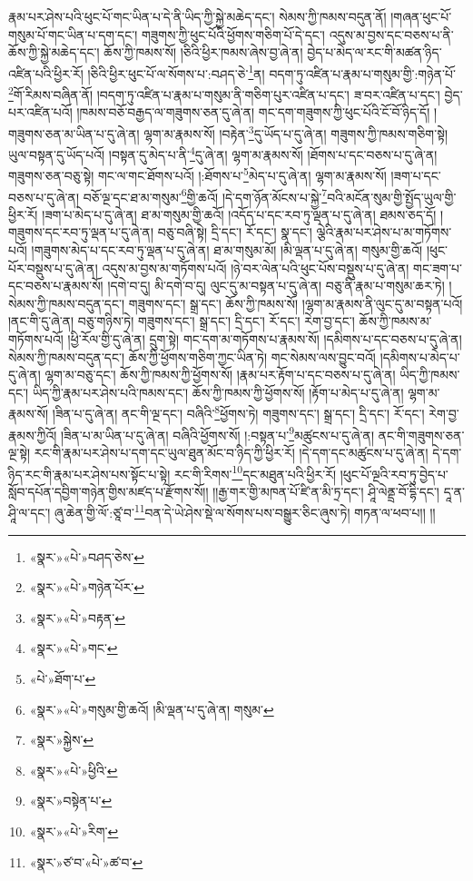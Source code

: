 རྣམ་པར་ཤེས་པའི་ཕུང་པོ་གང་ཡིན་པ་དེ་ནི་ཡིད་ཀྱི་སྐྱེ་མཆེད་དང་། སེམས་ཀྱི་ཁམས་བདུན་ནོ། །གཞན་ཕུང་པོ་གསུམ་པོ་གང་ཡིན་པ་དག་དང་། གཟུགས་ཀྱི་ཕུང་པོའི་ཕྱོགས་གཅིག་པོ་དེ་དང་། འདུས་མ་བྱས་དང་བཅས་པ་ནི་ཆོས་ཀྱི་སྐྱེ་མཆེད་དང་། ཆོས་ཀྱི་ཁམས་སོ། །ཅིའི་ཕྱིར་ཁམས་ཞེས་བྱ་ཞེ་ན། བྱེད་པ་མེད་ལ་རང་གི་མཚན་ཉིད་འཛིན་པའི་ཕྱིར་རོ། །ཅིའི་ཕྱིར་ཕུང་པོ་ལ་སོགས་པ་:བཤད་ཅེ་\footnote{«སྣར་»«པེ་»བཤད་ཅེས་}ན། བདག་ཏུ་འཛིན་པ་རྣམ་པ་གསུམ་གྱི་:གཉེན་པོ་\footnote{«སྣར་»«པེ་»གཉེན་པོར་}གོ་རིམས་བཞིན་ནོ། །བདག་ཏུ་འཛིན་པ་རྣམ་པ་གསུམ་ནི་གཅིག་པུར་འཛིན་པ་དང་། ཟ་བར་འཛིན་པ་དང་། བྱེད་པར་འཛིན་པའོ། །ཁམས་བཅོ་བརྒྱད་ལ་གཟུགས་ཅན་དུ་ཞེ་ན། གང་དག་གཟུགས་ཀྱི་ཕུང་པོའི་ངོ་བོ་ཉིད་དོ། །གཟུགས་ཅན་མ་ཡིན་པ་དུ་ཞེ་ན། ལྷག་མ་རྣམས་སོ། །བརྟེན་\footnote{«སྣར་»«པེ་»བརྟན་}དུ་ཡོད་པ་དུ་ཞེ་ན། གཟུགས་ཀྱི་ཁམས་གཅིག་སྟེ། ཡུལ་བསྟན་དུ་ཡོད་པའོ། །བསྟན་དུ་མེད་པ་ནི་\footnote{«སྣར་»«པེ་»གང་}དུ་ཞེ་ན། ལྷག་མ་རྣམས་སོ། །ཐོགས་པ་དང་བཅས་པ་དུ་ཞེ་ན། གཟུགས་ཅན་བཅུ་སྟེ། གང་ལ་གང་ཐོགས་པའོ། །:ཐོགས་པ་\footnote{«པེ་»ཐོག་པ་}མེད་པ་དུ་ཞེ་ན། ལྷག་མ་རྣམས་སོ། །ཟག་པ་དང་བཅས་པ་དུ་ཞེ་ན། བཅོ་ལྔ་དང་ཐ་མ་གསུམ་\footnote{«སྣར་»«པེ་»གསུམ་གྱི་ཆའོ། །མི་ལྡན་པ་དུ་ཞེ་ན། གསུམ་}གྱི་ཆའོ། །དེ་དག་ཉོན་མོངས་པ་སྐྱེ་\footnote{«སྣར་»སྐྱེས་}བའི་མངོན་སུམ་གྱི་སྤྱོད་ཡུལ་གྱི་ཕྱིར་རོ། །ཟག་པ་མེད་པ་དུ་ཞེ་ན། ཐ་མ་གསུམ་གྱི་ཆའོ། །འདོད་པ་དང་རབ་ཏུ་ལྡན་པ་དུ་ཞེ་ན། ཐམས་ཅད་དོ། །གཟུགས་དང་རབ་ཏུ་ལྡན་པ་དུ་ཞེ་ན། བཅུ་བཞི་སྟེ། དྲི་དང་། རོ་དང་། སྣ་དང་། ལྕེའི་རྣམ་པར་ཤེས་པ་མ་གཏོགས་པའོ། །གཟུགས་མེད་པ་དང་རབ་ཏུ་ལྡན་པ་དུ་ཞེ་ན། ཐ་མ་གསུམ་མོ། །མི་ལྡན་པ་དུ་ཞེ་ན། གསུམ་གྱི་ཆའོ། །ཕུང་པོར་བསྡུས་པ་དུ་ཞེ་ན། འདུས་མ་བྱས་མ་གཏོགས་པའོ། །ཉེ་བར་ལེན་པའི་ཕུང་པོས་བསྡུས་པ་དུ་ཞེ་ན། གང་ཟག་པ་དང་བཅས་པ་རྣམས་སོ། །དགེ་བ་དུ། མི་དགེ་བ་དུ། ལུང་དུ་མ་བསྟན་པ་དུ་ཞེ་ན། བཅུ་ནི་རྣམ་པ་གསུམ་ཆར་ཏེ། །སེམས་ཀྱི་ཁམས་བདུན་དང་། གཟུགས་དང་། སྒྲ་དང་། ཆོས་ཀྱི་ཁམས་སོ། །ལྷག་མ་རྣམས་ནི་ལུང་དུ་མ་བསྟན་པའོ། །ནང་གི་དུ་ཞེ་ན། བཅུ་གཉིས་ཏེ། གཟུགས་དང་། སྒྲ་དང་། དྲི་དང་། རོ་དང་། རེག་བྱ་དང་། ཆོས་ཀྱི་ཁམས་མ་གཏོགས་པའོ། །ཕྱི་རོལ་གྱི་དུ་ཞེ་ན། དྲུག་སྟེ། གང་དག་མ་གཏོགས་པ་རྣམས་སོ། །དམིགས་པ་དང་བཅས་པ་དུ་ཞེ་ན། སེམས་ཀྱི་ཁམས་བདུན་དང་། ཆོས་ཀྱི་ཕྱོགས་གཅིག་ཀྱང་ཡིན་ཏེ། གང་སེམས་ལས་བྱུང་བའོ། །དམིགས་པ་མེད་པ་དུ་ཞེ་ན། ལྷག་མ་བཅུ་དང་། ཆོས་ཀྱི་ཁམས་ཀྱི་ཕྱོགས་སོ། །རྣམ་པར་རྟོག་པ་དང་བཅས་པ་དུ་ཞེ་ན། ཡིད་ཀྱི་ཁམས་དང་། ཡིད་ཀྱི་རྣམ་པར་ཤེས་པའི་ཁམས་དང་། ཆོས་ཀྱི་ཁམས་ཀྱི་ཕྱོགས་སོ། །རྟོག་པ་མེད་པ་དུ་ཞེ་ན། ལྷག་མ་རྣམས་སོ། །ཟིན་པ་དུ་ཞེ་ན། ནང་གི་ལྔ་དང་། བཞིའི་\footnote{«སྣར་»«པེ་»ཕྱིའི་}ཕྱོགས་ཏེ། གཟུགས་དང་། སྒྲ་དང་། དྲི་དང་། རོ་དང་། རེག་བྱ་རྣམས་ཀྱིའོ། །ཟིན་པ་མ་ཡིན་པ་དུ་ཞེ་ན། བཞིའི་ཕྱོགས་སོ། །:བསྟན་པ་\footnote{«སྣར་»བསྟེན་པ་}མཚུངས་པ་དུ་ཞེ་ན། ནང་གི་གཟུགས་ཅན་ལྔ་སྟེ། རང་གི་རྣམ་པར་ཤེས་པ་དག་དང་ཡུལ་ཐུན་མོང་བ་ཉིད་ཀྱི་ཕྱིར་རོ། །དེ་དག་དང་མཚུངས་པ་དུ་ཞེ་ན། དེ་དག་ཉིད་རང་གི་རྣམ་པར་ཤེས་པས་སྟོང་པ་སྟེ། རང་གི་རིགས་\footnote{«སྣར་»«པེ་»རིག་}དང་མཐུན་པའི་ཕྱིར་རོ། །ཕུང་པོ་ལྔའི་རབ་ཏུ་བྱེད་པ་སློབ་དཔོན་དབྱིག་གཉེན་གྱིས་མཛད་པ་རྫོགས་སོ།། །།རྒྱ་གར་གྱི་མཁན་པོ་ཛི་ན་མི་ཏྲ་དང་། ཤཱི་ལེནྡྲ་བོ་དྷི་དང་། དཱ་ན་ཤཱི་ལ་དང་། ཞུ་ཆེན་གྱི་ལོ་:ཙཱ་བ་\footnote{«སྣར་»ཙ་བ་«པེ་»ཚ་བ་}བན་དེ་ཡེ་ཤེས་སྡེ་ལ་སོགས་པས་བསྒྱུར་ཅིང་ཞུས་ཏེ། གཏན་ལ་ཕབ་པ།། །།